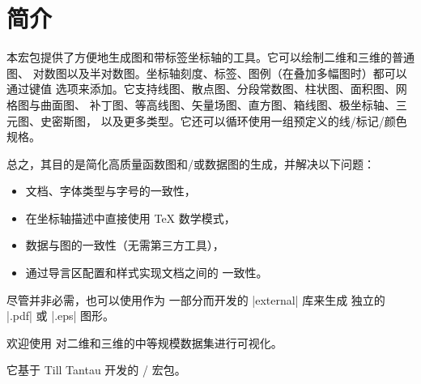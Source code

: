 
\chapter{简介}

本宏包提供了方便地生成图和带标签坐标轴的工具。它可以绘制二维和三维的普通图、
对数图以及半对数图。坐标轴刻度、标签、图例（在叠加多幅图时）都可以通过键值
选项来添加。它支持线图、散点图、分段常数图、柱状图、面积图、网格图与曲面图、
补丁图、等高线图、矢量场图、直方图、箱线图、极坐标轴、三元图、史密斯图，
以及更多类型。它还可以循环使用一组预定义的线/标记/颜色规格。

总之，其目的是简化高质量函数图和/或数据图的生成，并解决以下问题：
%
\begin{itemize}
    \item 文档、字体类型与字号的一致性，
    \item 在坐标轴描述中直接使用 \TeX{} 数学模式，
    \item 数据与图的一致性（无需第三方工具），
    \item 通过导言区配置和样式实现文档之间的
        一致性。
\end{itemize}
%
尽管并非必需，也可以使用作为 \Tikz{} 一部分而开发的 |external| 库来生成
独立的 |.pdf| 或 |.eps| 图形。

欢迎使用 \PGFPlots{} 对二维和三维的中等规模数据集进行可视化。

它基于 Till Tantau 开发的 \PGF{}/\Tikz{} 宏包。
